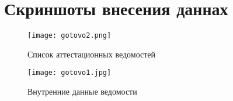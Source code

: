 \documentclass[12pt,a4paper]{scrartcl}
\begin{document}
\section{Скриншоты внесения даннах}
\label{sec:picexample}
\begin{figure}[h]
	\centering
	\texttt{[image: gotovo2.png]}
	\caption{Список аттестационных ведомостей}\label{fig:par}
\end{figure}
\begin{figure}[h]
	\centering
	\texttt{[image: gotovo1.jpg]}
	\caption{Внутренние данные ведомости}\label{fig:par}
\end{figure}
\end{document}
